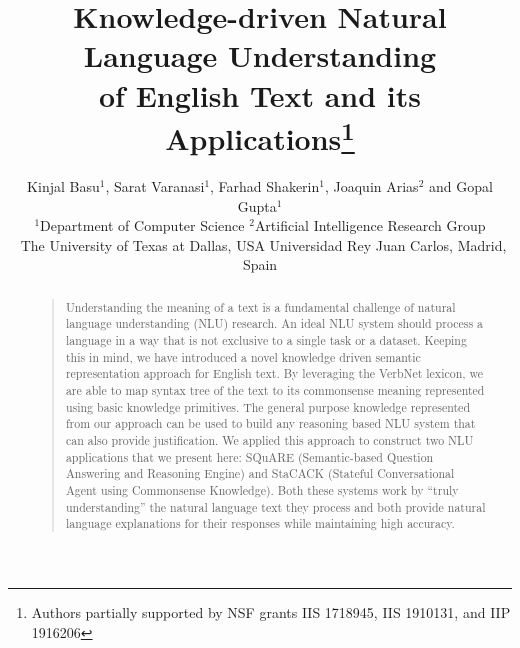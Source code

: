 \documentclass[letterpaper]{article}
\begin{document}
%
\title{Knowledge-driven Natural Language Understanding\\of English Text and its Applications\thanks{Authors partially supported by NSF grants IIS 1718945, IIS 1910131, and IIP 1916206}}

\author {
  Kinjal Basu$^1$, Sarat  Varanasi$^1$, Farhad Shakerin$^1$, Joaquin Arias$^2$ and Gopal Gupta$^1$\\[.5em]
  {  \large $^1$Department of Computer Science \hfill $^2$Artificial Intelligence Research Group}\\{\large ~\hspace{.3em}The University of Texas at Dallas, USA\hspace{.7em} \hfill Universidad Rey Juan Carlos, Madrid, Spain}
}



\maketitle
\begin{abstract}
\begin{quote}
Understanding the meaning of a text is a fundamental challenge of natural language understanding (NLU) research. An ideal NLU system should process a language in a way that is not exclusive to a single task or a dataset. Keeping this in mind, we have introduced a novel knowledge driven semantic representation approach for English text. By leveraging the VerbNet lexicon, we are able to map syntax tree of the text to its commonsense meaning represented using basic knowledge primitives. The general purpose knowledge represented from our approach can be used to build any reasoning based NLU system that can also provide justification. We applied this approach to construct two NLU applications that we present here: SQuARE (Semantic-based Question Answering and Reasoning Engine) and StaCACK (Stateful Conversational Agent using Commonsense Knowledge).
Both these systems work by ``truly understanding'' the natural language text they process and both provide natural language explanations for their responses while maintaining high accuracy.

\end{quote}
\end{abstract}
\end{document}
